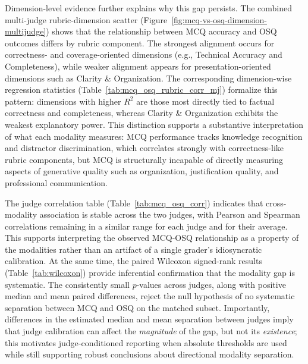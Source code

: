 Dimension-level evidence further explains why this gap persists. The combined multi-judge rubric-dimension scatter (Figure~\ref{fig:mcq-vs-osq-dimension-multijudge}) shows that the relationship between MCQ accuracy and OSQ outcomes differs by rubric component. The strongest alignment occurs for correctness- and coverage-oriented dimensions (e.g., Technical Accuracy and Completeness), while weaker alignment appears for presentation-oriented dimensions such as Clarity \& Organization. The corresponding dimension-wise regression statistics (Table~\ref{tab:mcq_osq_rubric_corr_mj}) formalize this pattern: dimensions with higher \(R^2\) are those most directly tied to factual correctness and completeness, whereas Clarity \& Organization exhibits the weakest explanatory power. This distinction supports a substantive interpretation of what each modality measures: MCQ performance tracks knowledge recognition and distractor discrimination, which correlates strongly with correctness-like rubric components, but MCQ is structurally incapable of directly measuring aspects of generative quality such as organization, justification quality, and professional communication.

The judge correlation table (Table~\ref{tab:mcq_osq_corr}) indicates that cross-modality association is stable across the two judges, with Pearson and Spearman correlations remaining in a similar range for each judge and for their average. This supports interpreting the observed MCQ-OSQ relationship as a property of the modalities rather than an artifact of a single grader's idiosyncratic calibration. At the same time, the paired Wilcoxon signed-rank results (Table~\ref{tab:wilcoxon}) provide inferential confirmation that the modality gap is systematic. The consistently small \(p\)-values across judges, along with positive median and mean paired differences, reject the null hypothesis of no systematic separation between MCQ and OSQ on the matched subset. Importantly, differences in the estimated median and mean separation between judges imply that judge calibration can affect the \emph{magnitude} of the gap, but not its \emph{existence}; this motivates judge-conditioned reporting when absolute thresholds are used while still supporting robust conclusions about directional modality separation.

